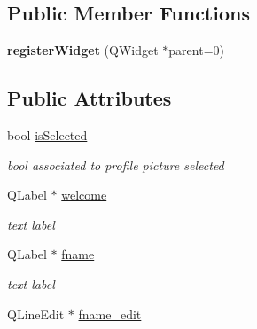 \subsection*{Public Member Functions}
\begin{DoxyCompactItemize}
\item 
\hypertarget{classregisterWidget_af5e6d9d69ab0118435e4d3f4bc5eb64d}{{\bfseries register\-Widget} (Q\-Widget $\ast$parent=0)}\label{classregisterWidget_af5e6d9d69ab0118435e4d3f4bc5eb64d}

\end{DoxyCompactItemize}
\subsection*{Public Attributes}
\begin{DoxyCompactItemize}
\item 
\hypertarget{classregisterWidget_a66a788d7d8b9b254ffc2bfe421065458}{bool \hyperlink{classregisterWidget_a66a788d7d8b9b254ffc2bfe421065458}{is\-Selected}}\label{classregisterWidget_a66a788d7d8b9b254ffc2bfe421065458}

\begin{DoxyCompactList}\small\item\em bool associated to profile picture selected \end{DoxyCompactList}\item 
\hypertarget{classregisterWidget_a782907f08a369c112237019412c93491}{Q\-Label $\ast$ \hyperlink{classregisterWidget_a782907f08a369c112237019412c93491}{welcome}}\label{classregisterWidget_a782907f08a369c112237019412c93491}

\begin{DoxyCompactList}\small\item\em text label \end{DoxyCompactList}\item 
\hypertarget{classregisterWidget_a264fd2aa96e8ba38420c793c8b4ae7e5}{Q\-Label $\ast$ \hyperlink{classregisterWidget_a264fd2aa96e8ba38420c793c8b4ae7e5}{fname}}\label{classregisterWidget_a264fd2aa96e8ba38420c793c8b4ae7e5}

\begin{DoxyCompactList}\small\item\em text label \end{DoxyCompactList}\item 
\hypertarget{classregisterWidget_a2fbf9a6aad9e9f6da6094c56e4e76719}{Q\-Line\-Edit $\ast$ \hyperlink{classregisterWidget_a2fbf9a6aad9e9f6da6094c56e4e76719}{fname\-\_\-edit}}\label{classregisterWidget_a2fbf9a6aad9e9f6da6094c56e4e76719}


\end{DoxyCompactItemize}
